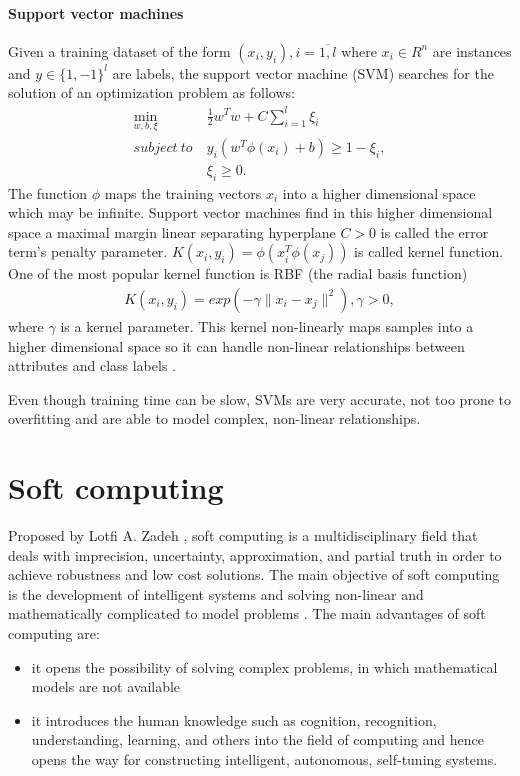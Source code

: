 \paragraph{Support vector machines}

Given a training dataset of the form $(x_{i}, y_{i}), i=\overline{1,l}$ where $x_{i} \in R^{n}$ are instances and $y \in \{1,-1 \}^{l}$ are labels, the support vector machine (SVM) \cite{Hsu00APractical} searches for the solution of an optimization problem as follows:
\begin{align}
\min_{w,b,\xi} &~ \frac{1}{2}w^{T}w + C\sum_{i=1}^{l}\xi_{i}\\
subject ~to     &~ y_{i}(w^{T}\phi(x_{i})+b) \geq 1-\xi_{i},\\
				&~ \xi_{i} \geq 0.
\end{align}
The function $\phi$ maps the training vectors $x_{i}$ into a higher dimensional space which  may be infinite.
Support vector machines find in this higher dimensional space a maximal margin linear separating hyperplane
$C > 0$ is called the error term's penalty parameter.  $K(x_{i},y_{i}) = \phi (x_{i}^{T} \phi (x_{j}))$ is called kernel function. One of the most popular kernel function is RBF (the radial basis function)
\begin{align}
K(x_{i},y_{i}) = exp(-\gamma \parallel x_{i} - x_{j} \parallel^{2}), \gamma > 0,
\end{align}
where $\gamma$ is a kernel parameter. This kernel non-linearly maps samples into a higher dimensional space so it can handle non-linear relationships between attributes and class labels \cite{Hsu00APractical}.

Even though training time can be slow, SVMs are very accurate, not too prone to overfitting and are able to model complex, non-linear relationships. 


\section{Soft computing}
\label{chap:softcomputing}

Proposed by Lotfi A. Zadeh \cite{blair94short}, soft computing \cite{Zadeh:soft} is a multidisciplinary field  that deals with imprecision, uncertainty, approximation, and partial truth in order to achieve robustness and low cost solutions. The main objective of soft computing is the development of intelligent systems and solving non-linear and mathematically complicated to model problems \cite{Zadeh97TheRoles}. The main advantages of soft computing are:
\begin{itemize}
\item it opens the possibility of solving complex problems, in which mathematical models are not available
\item it introduces the human knowledge such as cognition, recognition, understanding, learning, and others into the field of computing and hence opens the way for constructing intelligent, autonomous, self-tuning systems.
\end{itemize}

